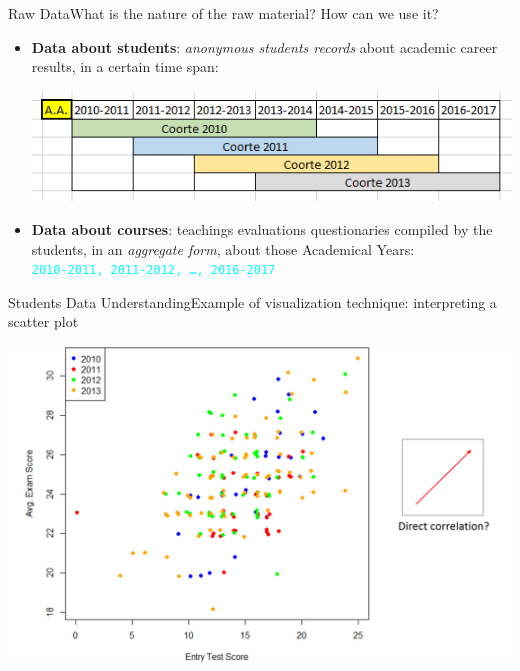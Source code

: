 \begin{frame}{Raw Data}{What is the nature of the raw material? How can we use it?}

\begin{itemize}

    \item<1->\textbf{Data about \alert{students}}: \emph{anonymous students records} about academic career results, in a certain time span: \\
        \noindent\begin{centering}
            \includegraphics[scale=0.50]{../raw/stud_comp.png}
        \end{centering}

    \vspace{0.2cm}

    \item<2->\textbf{Data about \alert{courses}}: teachings evaluations questionaries compiled by the students, in an \emph{aggregate form}, about those Academical Years: \\ \vspace{0.1cm}
        \hspace{0.6cm}\textcolor{cyan}{\texttt{2010-2011, 2011-2012, \ldots, 2016-2017}}

\end{itemize}

\end{frame}

\begin{frame}{Students Data Understanding}{Example of visualization technique: interpreting a scatter plot}

    \vspace{0.2cm}
    \begin{centering}
        \includegraphics[scale=0.28]{img2_noback.png}
    \end{centering}

\end{frame}

